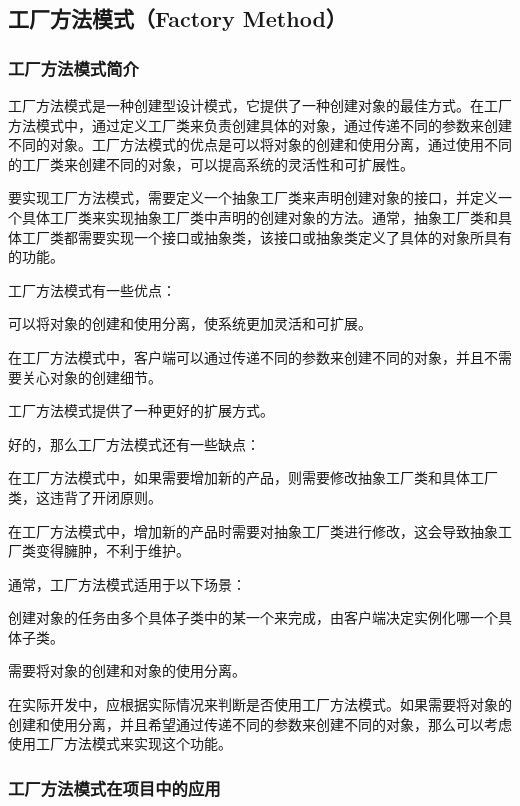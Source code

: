 \subsection{工厂方法模式（Factory Method）}

\subsubsection{工厂方法模式简介}

工厂方法模式是一种创建型设计模式，它提供了一种创建对象的最佳方式。在工厂方法模式中，通过定义工厂类来负责创建具体的对象，通过传递不同的参数来创建不同的对象。工厂方法模式的优点是可以将对象的创建和使用分离，通过使用不同的工厂类来创建不同的对象，可以提高系统的灵活性和可扩展性。

要实现工厂方法模式，需要定义一个抽象工厂类来声明创建对象的接口，并定义一个具体工厂类来实现抽象工厂类中声明的创建对象的方法。通常，抽象工厂类和具体工厂类都需要实现一个接口或抽象类，该接口或抽象类定义了具体的对象所具有的功能。

工厂方法模式有一些优点：

可以将对象的创建和使用分离，使系统更加灵活和可扩展。

在工厂方法模式中，客户端可以通过传递不同的参数来创建不同的对象，并且不需要关心对象的创建细节。

工厂方法模式提供了一种更好的扩展方式。

好的，那么工厂方法模式还有一些缺点：

在工厂方法模式中，如果需要增加新的产品，则需要修改抽象工厂类和具体工厂类，这违背了开闭原则。

在工厂方法模式中，增加新的产品时需要对抽象工厂类进行修改，这会导致抽象工厂类变得臃肿，不利于维护。

通常，工厂方法模式适用于以下场景：

创建对象的任务由多个具体子类中的某一个来完成，由客户端决定实例化哪一个具体子类。

需要将对象的创建和对象的使用分离。

在实际开发中，应根据实际情况来判断是否使用工厂方法模式。如果需要将对象的创建和使用分离，并且希望通过传递不同的参数来创建不同的对象，那么可以考虑使用工厂方法模式来实现这个功能。

\subsubsection{工厂方法模式在项目中的应用}

